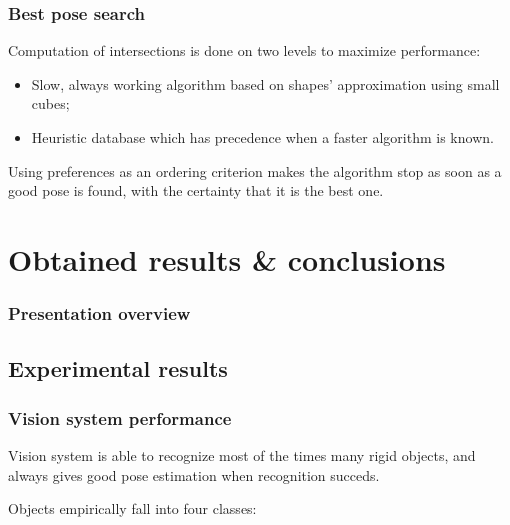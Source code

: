 \documentclass{beamer}
\begin{document}
  \begin{frame}
    \frametitle{Best pose search}
    Computation of intersections is done on two levels to maximize
    performance:
    \begin{itemize}
    \item{Slow, always working algorithm based on shapes' approximation
      using small cubes;}
    \item{Heuristic database which has precedence when a faster
      algorithm is known.}
    \end{itemize}
    \pause
    \alert{Using preferences as an ordering criterion makes the algorithm
    stop as soon as a good pose is found, with the certainty that it
    is the best one.}
  \end{frame}
  \section{Obtained results \& conclusions}
  \begin{frame}
    \frametitle{Presentation overview}
    \tableofcontents[currentsection]
  \end{frame}

  \subsection{Experimental results}
  \begin{frame}
    \frametitle{Vision system performance}
    Vision system is able to recognize most of the times many rigid
    objects, and always gives good pose estimation when recognition
    succeds.

    Objects empirically fall into four classes:

    \begin{columns}[c]
    \end{columns}
  \end{frame}
\end{document}
